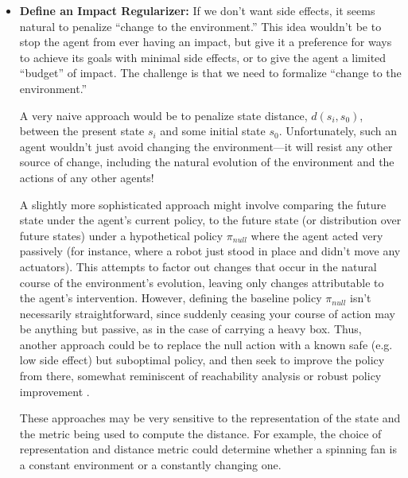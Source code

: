\documentclass[a4paper,10pt]{article}
\begin{document}
\begin{itemize}
\item {\bf Define an Impact Regularizer:} If we don’t want side effects, it seems natural to penalize ``change to the environment.''  This idea wouldn’t be to stop the agent from ever having an impact, but give it a preference for ways to achieve its goals with minimal side effects, or to give the agent a limited ``budget'' of impact. The challenge is that we need to formalize ``change to the environment.”

A very naive approach would be to penalize state distance, $d(s_i, s_0)$, between the present state $s_i$ and some initial state $s_0$. Unfortunately, such an agent wouldn’t just avoid changing the environment---it will resist any other source of change, including the natural evolution of the environment and the actions of any other agents!

A slightly more sophisticated approach might involve comparing the future state under the agent’s current policy, to the future state (or distribution over future states) under a hypothetical policy $\pi_{null}$ where the agent acted very passively (for instance, where a robot just stood in place and didn’t move any actuators). This attempts to factor out changes that occur in the natural course of the environment’s evolution, leaving only changes attributable to the agent’s intervention. However, defining the baseline policy $\pi_{null}$ isn’t necessarily straightforward, since suddenly ceasing your course of action may be anything but passive, as in the case of carrying a heavy box.  Thus, another approach could be to replace the null action with a known safe (e.g. low side effect) but suboptimal policy, and then seek to improve the policy from there, somewhat reminiscent of reachability analysis \cite{lygeros1999controllers,mitchell2005time} or robust policy improvement \cite{iyengar2005robust,nilim2005robust}.

These approaches may be very sensitive to the representation of the state and the metric being used to compute the distance. For example, the choice of representation and distance metric could determine whether a spinning fan is a constant environment or a constantly changing one.


\end{itemize}
\end{document}
